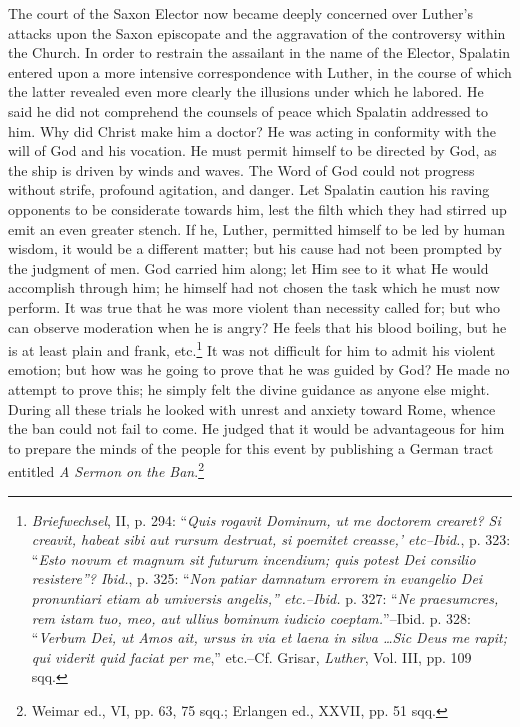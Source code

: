 The court of the Saxon Elector now became deeply concerned over
Luther’s attacks upon the Saxon episcopate and the aggravation of
the controversy within the Church. In order to restrain the assailant
in the name of the Elector, Spalatin entered upon a more intensive
correspondence with Luther, in the course of which the latter revealed
even more clearly the illusions under which he labored. He said
he did not comprehend the counsels of peace which Spalatin addressed to
him. Why did Christ make him a doctor? He was acting in
conformity with the will of God and his vocation. He must permit
himself to be directed by God, as the ship is driven by winds and
waves. The Word of God could not progress without strife, profound
agitation, and danger. Let Spalatin caution his raving opponents to
be considerate towards him, lest the filth which they had stirred up
emit an even greater stench. If he, Luther, permitted himself to be
led by human wisdom, it would be a different matter; but his cause
had not been prompted by the judgment of men. God carried him
along; let Him see to it what He would accomplish through him;
he himself had not chosen the task which he must now perform.
It was true that he was more violent than necessity called for; but
who can observe moderation when he is angry? He feels that his
blood boiling, but he is at least plain and frank, etc.\footnote
{\textit{Briefwechsel}, II, p. 294: “\textit{Quis rogavit Dominum, ut me doctorem crearet? Si creavit,
habeat sibi aut rursum destruat, si poemitet creasse,’ etc--Ibid.}, p. 323: ``\textit{Esto novum
et magnum sit futurum incendium; quis potest Dei consilio resistere”? Ibid.}, p. 325:
“\textit{Non patiar damnatum errorem in evangelio Dei pronuntiari etiam ab umiversis angelis,”
etc.--Ibid.} p. 327: “\textit{Ne praesumcres, rem istam tuo, meo, aut ullius bominum iudicio
coeptam.}”--Ibid. p. 328: “\textit{Verbum Dei, ut Amos ait, ursus in via et laena in silva \dots Sic
Deus me rapit; qui viderit quid faciat per me},” etc.--Cf. Grisar, \textit{Luther}, Vol. III, pp.
109 sqq.}
It was not
difficult for him to admit his violent emotion; but how was he going
to prove that he was guided by God? He made no attempt to prove
this; he simply felt the divine guidance as anyone else might.
During all these trials he looked with unrest and anxiety toward
Rome, whence the ban could not fail to come.
He judged that it would be advantageous for him to prepare the
minds of the people for this event by publishing a German tract
entitled \textit{A Sermon on the Ban}.\footnote
{Weimar ed., VI, pp. 63, 75 sqq.; Erlangen ed., XXVII, pp. 51 sqq.}
